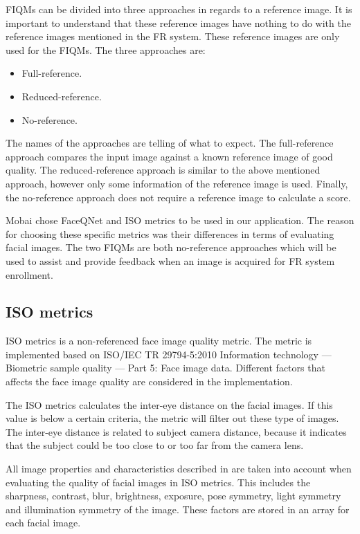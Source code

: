 FIQMs can be divided into three approaches in regards to a reference image. It is important to understand that these reference images have nothing to do with the reference images mentioned in the FR system. These reference images are only used for the FIQMs. The three approaches are: 
%
\begin{itemize}
    \item Full-reference.
    \item Reduced-reference.
    \item No-reference. 
\end{itemize}
%
The names of the approaches are telling of what to expect. The full-reference approach compares the input image against a known reference image of good quality. The reduced-reference approach is similar to the above mentioned approach, however only some information of the reference image is used. Finally, the no-reference approach does not require a reference image to calculate a score. 

Mobai chose FaceQNet and ISO metrics to be used in our application. The reason for choosing these specific metrics was their differences in terms of evaluating facial images. The two FIQMs are both no-reference approaches which will be used to assist and provide feedback when an image is acquired for FR system enrollment. 


\subsection{ISO metrics}
ISO metrics is a non-referenced face image quality metric. The metric is implemented based on ISO/IEC TR 29794-5:2010 Information technology — Biometric sample quality — Part 5: Face image data. Different factors that affects the face image quality are considered in the implementation. 

The ISO metrics calculates the inter-eye distance on the facial images. If this value is below a certain criteria, the metric will filter out these type of images. The inter-eye distance is related to subject camera distance, because it indicates that the subject could be too close to or too far from the camera lens. 

All image properties and characteristics described in \cite{ISO50912} are taken into account when evaluating the quality of facial images in ISO metrics. This includes the sharpness, contrast, blur, brightness, exposure, pose symmetry, light symmetry and illumination symmetry of the image. These factors are stored in an array for each facial image. 

